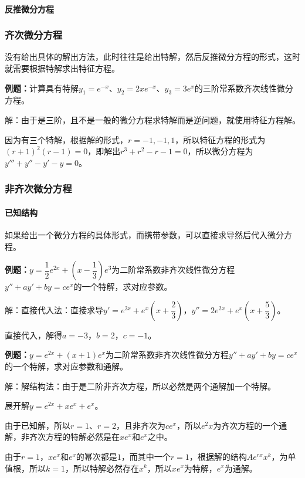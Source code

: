 \paragraph{反推微分方程}

\subsubsection{齐次微分方程}

没有给出具体的解出方法，此时往往是给出特解，然后反推微分方程的形式，这时就需要根据特解求出特征方程。

\textbf{例题：}计算具有特解$y_1=e^{-x}$、$y_2=2xe^{-x}$、$y_3=3e^x$的三阶常系数齐次线性微分方程。

解：由于是三阶，且不是一般的微分方程求特解而是逆问题，就使用特征方程解。

因为有三个特解，根据解的形式，$r=-1,-1,1$，所以特征方程的形式为$(r+1)^2(r-1)=0$，即解出$r^3+r^2-r-1=0$，所以微分方程为$y'''+y''-y'-y=0$。

\subsubsection{非齐次微分方程}

\paragraph{已知结构} \leavevmode \medskip

如果给出一个微分方程的具体形式，而携带参数，可以直接求导然后代入微分方程。

\textbf{例题：}$y=\dfrac{1}{2}e^{2x}+(x-\dfrac{1}{3})e^3$为二阶常系数非齐次线性微分方程$y''+ay'+by=ce^x$的一个特解，求对应参数。

解：直接代入法：直接求导$y'=e^{2x}+e^x(x+\dfrac{2}{3})$，$y''=2e^{2x}+e^x(x+\dfrac{5}{3})$。

直接代入，解得$a=-3$，$b=2$，$c=-1$。

\textbf{例题：}$y=e^{2x}+(x+1)e^x$为二阶常系数非齐次线性微分方程$y''+ay'+by=ce^x$的一个特解，求对应参数和通解。

解：解结构法：由于是二阶非齐次方程，所以必然是两个通解加一个特解。

展开解$y=e^{2x}+xe^x+e^x$。

由于已知解，所以$r=1$、$r=2$，且非齐次为$ce^x$，所以$e^2x$为齐次方程的一个通解，非齐次方程的特解必然是在$xe^x$和$e^x$之中。

由于$r=1$，$xe^x$和$e^x$的幂次都是$1$，而其中一个$r=1$，根据解的结构$Ae^{rx}x^k$，为单值根，所以$k=1$，所以特解必然存在$x^k$，所以$xe^x$为特解，$e^x$为通解。

